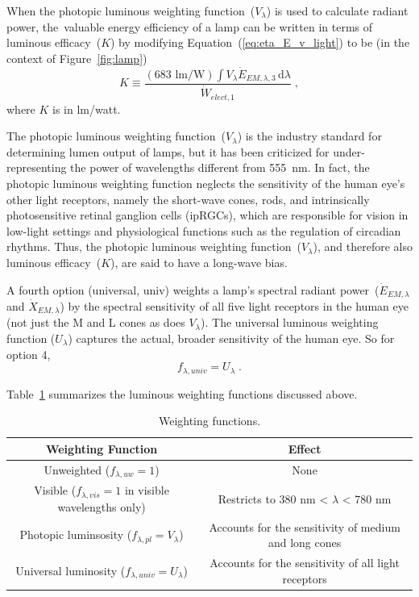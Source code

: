 \documentclass[energies,article,accept,moreauthors,pdftex]{Definitions/mdpi}\usepackage[]{graphicx}\usepackage[]{color}
\newcommand{\humaneyesensitivity}{380 nm < $\lambda$ < 780 nm}
\begin{document}
When the photopic luminous weighting function~($V_\lambda$) is used 
to calculate radiant power, 
\mbox{the valuable} energy efficiency of a lamp can be written in terms of luminous efficacy~($K$)
by modifying Equation~(\ref{eq:eta_E_v_light}) to be (in the context of Figure~\ref{fig:lamp})
\begin{equation} \label{eq:lum_effic_def}
  K \equiv \frac{(683 \text{ lm/W}) \int V_\lambda \dot{E}_{EM,\lambda,3} \, \mathrm{d}\lambda}{\dot{W}_{elect,1}} \; ,
\end{equation}
%
where $K$ is in lm/watt.

The photopic luminous weighting function~($V_\lambda$) is the industry standard for determining lumen output
of lamps, but it has been criticized for under-representing
the power of wavelengths different from 555~nm. 
In fact, the photopic luminous weighting function
neglects the sensitivity of the human eye's other light receptors,
namely the short-wave cones,
rods, and intrinsically photosensitive retinal ganglion cells (ipRGCs),
which are responsible for vision in low-light settings and
physiological functions such as the regulation of circadian rhythms.
Thus, the photopic luminous weighting function~($V_\lambda$),
and therefore also luminous efficacy~($K$),
are said to have a long-wave bias.

A fourth option (universal, univ) weights 
a lamp's spectral radiant power~($\dot{E}_{EM,\lambda}$ and $\dot{X}_{EM,\lambda}$)
by the spectral sensitivity of all five light receptors in the human eye
(not just the M and L cones as does $V_\lambda$). 
The universal luminous weighting function ($U_\lambda$) \cite{Rea2018}
captures the actual, broader sensitivity of the human eye.
So for option 4,
\begin{equation} \label{eq:f4}
  f_{\lambda,univ} = U_\lambda \; .
\end{equation}

Table~\ref{tab:wfs} summarizes the luminous weighting functions discussed above.

\begin{table}[H]
\centering %
\caption{Weighting functions.}
\begin{tabular}{cc}
  \toprule
  \textbf{Weighting Function} & \textbf{Effect} \\
  \midrule
  Unweighted ($f_{\lambda,uw} = 1$)  & None \\
  Visible ($f_{\lambda,vis} = 1$ in visible wavelengths only) & Restricts to \humaneyesensitivity{} \\
  Photopic luminsosity ($f_{\lambda,pl} = V_\lambda$) \cite{CVRL2008} & Accounts for the sensitivity of medium and long cones \\
  Universal luminosity ($f_{\lambda,univ} = U_\lambda$) \cite{Rea2018} & Accounts for the sensitivity of all light receptors \\
  \bottomrule
\end{tabular}
\label{tab:wfs}
\end{table}
\end{document}
